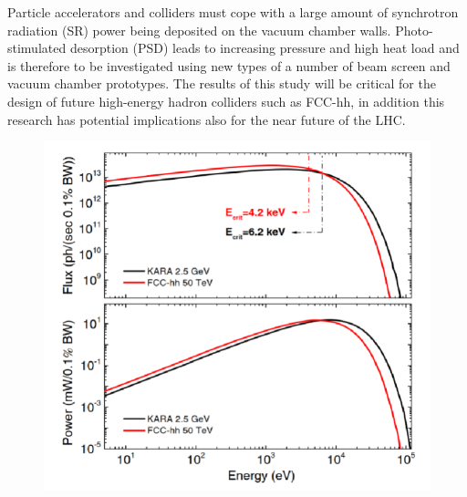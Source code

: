 Particle accelerators and colliders must cope with a large amount of synchrotron radiation (SR) power being deposited on the vacuum chamber walls.
Photo-stimulated desorption (PSD) leads to increasing pressure and high heat load and is therefore to be investigated using new types of a number of beam screen and vacuum chamber prototypes. The results of this study will be critical for the design of future high-energy hadron colliders such as FCC-hh, in addition this research has potential implications also for the near future of the LHC. 
\begin{figure}[H]
  \centering
  \begin{minipage}[c]{0.45\textwidth}
    \includegraphics[width=\textwidth]{graphics/wp3-KIT_FCCphotons.png}
  \end{minipage}%
  \hfill
  \begin{minipage}[c]{0.5\textwidth}
    \vspace*{\fill}
    \label{fig:yourlabel}
    \vspace*{\fill}
  \end{minipage}
\end{figure}

